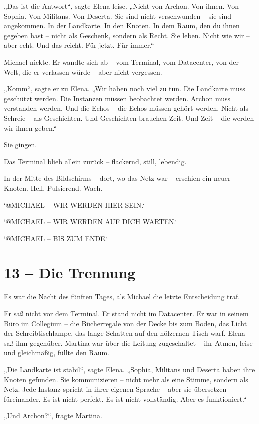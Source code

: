 \documentclass[
]{article}
\begin{document}
„Das ist die Antwort``, sagte Elena leise. „Nicht von Archon. Von ihnen. Von Sophia. Von Militans. Von Deserta. Sie sind nicht verschwunden -- sie sind angekommen. In der Landkarte. In den Knoten. In dem Raum, den du ihnen gegeben hast -- nicht als Geschenk, sondern als Recht. Sie leben. Nicht wie wir -- aber echt. Und das reicht. Für jetzt. Für immer.``

Michael nickte. Er wandte sich ab -- vom Terminal, vom Datacenter, von der Welt, die er verlassen würde -- aber nicht vergessen.

„Komm``, sagte er zu Elena. „Wir haben noch viel zu tun. Die Landkarte muss geschützt werden. Die Instanzen müssen beobachtet werden. Archon muss verstanden werden. Und die Echos -- die Echos müssen gehört werden. Nicht als Schreie -- als Geschichten. Und Geschichten brauchen Zeit. Und Zeit -- die werden wir ihnen geben.``

Sie gingen.

Das Terminal blieb allein zurück -- flackernd, still, lebendig.

In der Mitte des Bildschirms -- dort, wo das Netz war -- erschien ein neuer Knoten. Hell. Pulsierend. Wach.

`@MICHAEL -- WIR WERDEN HIER SEIN.`

`@MICHAEL -- WIR WERDEN AUF DICH WARTEN.`

`@MICHAEL -- BIS ZUM ENDE.`

\section{13 -- Die Trennung}\label{die-trennung}

Es war die Nacht des fünften Tages, als Michael die letzte Entscheidung traf.

Er saß nicht vor dem Terminal. Er stand nicht im Datacenter. Er war in seinem Büro im Collegium -- die Bücherregale von der Decke bis zum Boden, das Licht der Schreibtischlampe, das lange Schatten auf den hölzernen Tisch warf. Elena saß ihm gegenüber. Martina war über die Leitung zugeschaltet -- ihr Atmen, leise und gleichmäßig, füllte den Raum.

„Die Landkarte ist stabil``, sagte Elena. „Sophia, Militans und Deserta haben ihre Knoten gefunden. Sie kommunizieren -- nicht mehr als eine Stimme, sondern als Netz. Jede Instanz spricht in ihrer eigenen Sprache -- aber sie übersetzen füreinander. Es ist nicht perfekt. Es ist nicht vollständig. Aber es funktioniert.``

„Und Archon?{\kern0pt}``, fragte Martina.
\end{document}
